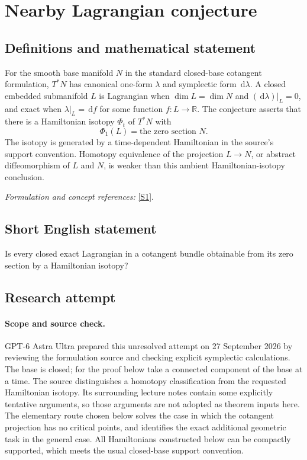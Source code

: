 \documentclass[11pt]{article}
\begin{document}
\section*{\texorpdfstring{Nearby Lagrangian conjecture}{Nearby Lagrangian conjecture}}\label{statement}
\subsection{Definitions and mathematical statement}
For the smooth base manifold $N$ in the standard closed-base cotangent formulation, $T^*N$ has canonical one-form $\lambda$ and symplectic form ${\,\mathrm{d}}\lambda$. A closed embedded submanifold $L$ is Lagrangian when $\dim L=\dim N$ and $({\,\mathrm{d}}\lambda)|_L=0$, and exact when $\lambda|_L={\,\mathrm{d}} f$ for some function $f:L\to{\mathbb{R}}$. The conjecture asserts that there is a Hamiltonian isotopy $\Phi_t$ of $T^*N$ with
\[
 \Phi_1(L)=\text{the zero section }N.
\]
The isotopy is generated by a time-dependent Hamiltonian in the source's support convention. Homotopy equivalence of the projection $L\to N$, or abstract diffeomorphism of $L$ and $N$, is weaker than this ambient Hamiltonian-isotopy conclusion.
\par\smallskip\textit{Formulation and concept references:} \href{https://www.math.stonybrook.edu/~fzheng/seminar-f24/notes/week-1-2.pdf}{[S1]}.

\subsection{Short English statement}
Is every closed exact Lagrangian in a cotangent bundle obtainable from its zero section by a Hamiltonian isotopy?
\subsection{Research attempt}
\paragraph{Scope and source check.}
GPT-6 Astra Ultra prepared this unresolved attempt on 27 September 2026
by reviewing the formulation source and checking explicit symplectic
calculations. The base is closed; for the proof below take a connected
component of the base at a time. The source distinguishes a homotopy
classification from the requested Hamiltonian isotopy. Its surrounding
lecture notes contain some explicitly tentative arguments, so those
arguments are not adopted as theorem inputs here. The elementary route
chosen below solves the case in which the cotangent projection has no
critical points, and identifies the exact additional geometric task in
the general case. All Hamiltonians constructed below can be compactly
supported, which meets the usual closed-base support convention.
\end{document}
